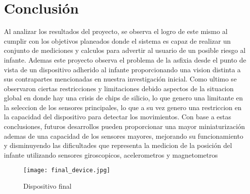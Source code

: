 \section{Conclusión}
Al analizar los resultados del proyecto, se observa el logro de este mismo al 
cumplir con los objetivos planeados donde el sistema es capaz de realizar un 
conjunto de mediciones y calculos para advertir al usuario de un posible riesgo al infante.
Ademas este proyecto observa el problema de la asfixia desde el punto de vista de un 
dispositivo adherido al infante proporcionando una vision distinta a sus contrapartes 
mencionadas en nuestra investigación inicial.
Como ultimo se observaron ciertas restricciones y limitaciones debido aspectos 
de la situacion global en donde hay una crisis de chips de silicio, lo que genero 
una limitante en la seleccion de los sensores principales, lo que a su vez genero 
una restriccion en la capacidad del dispositivo para detectar los movimientos.
Con base a estas conclusiones, futuros desarrollos pueden proporcionar una mayor 
miniaturización ademas de una capacidad de los sensores mayores, mejorando su 
funcionamiento y disminuyendo las dificultades que representa la medicion de la
posición del infante utilizando sensores giroscopicos, acelerometros y magnetometros

\begin{figure}[htp!]
    \centering
    \texttt{[image: final\_device.jpg]}
    \caption{Dispositivo final}
    \label{fig: final_device}
\end{figure}
\FloatBarrier